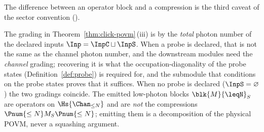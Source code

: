 
The difference between an operator block and a compression is the third
caveat of the sector convention
().

\begin{remark}\label{rem:blockmeaning}
The grading in Theorem~\ref{thm:click-povm}\,(iii) is by the \emph{total} photon
number of the declared inputs $\Inp=\InpC\sqcup\InpS$. When a probe is
declared, that is not the same as the channel photon number, and the
downstream modules need the \emph{channel} grading; recovering it is what the
occupation-diagonality of the probe states (Definition~\ref{def:probe}) is
required for, and the submodule that conditions on the probe states proves
that it suffices. When no probe is
declared ($\InpS=\varnothing$) the two gradings coincide. The emitted
low-photon blocks $\blk{M}{\leqN}_S$ are operators on
$\Hs{\Chan_{\leq N}}$ and are \emph{not} the compressions
$\Pnum{\le N}M_S\Pnum{\le N}$; emitting them is a decomposition of the
physical POVM, never a squashing argument.
\end{remark}
